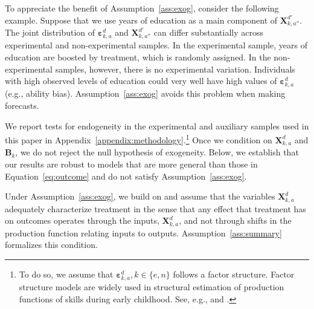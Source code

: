To appreciate the benefit of Assumption~\ref{ass:exog}, consider the following example. Suppose that we use years of education as a main component of $\bm{X}_{k,{a''}}^{d'}$. The joint distribution of $\bm{\varepsilon}_{k,a}^d$ and $\bm{X}_{k,{a''}}^{d'}$ can differ substantially across experimental and non-experimental samples. In the experimental sample, years of education are boosted by treatment, which is randomly assigned. In the non-experimental samples, however, there is no experimental variation. Individuals with high observed levels of education could very well have high values of  $\bm{\varepsilon}_{k,a}^d$ (e.g., ability bias). Assumption~\ref{ass:exog} avoids this problem when making forecasts.

We report tests for endogeneity in the experimental and auxiliary samples used in this paper in Appendix~\ref{appendix:methodology}.\footnote{To do so, we assume that $\bm{\varepsilon}_{k,a}^d, k \in \{e,n\}$ follows a factor structure. Factor structure models are widely used in structural estimation of production functions of skills during early childhood. See, e.g., \citet{Cunha_Heckman_2008_JHR} and \citet{Cunha_Heckman_etal_2010_est_tech_cognoncog}.} Once we condition on $\bm{X}_{k,a}^d$ and $\bm{B}_{k}$, we do not reject the null hypothesis of exogeneity. Below, we establish that our results are robust to models that are more general than those in Equation~\eqref{eq:outcome} and do not satisfy Assumption~\ref{ass:exog}.

Under Assumption~\ref{ass:exog}, we build on \citet{Heckman_Pinto_etal_2013_PerryFactor} and assume that the variables $\bm{X}_{k,a}^d$ adequately characterize treatment in the sense that any effect that treatment has on outcomes operates through the inputs, $\bm{X}_{k,a}^d$, and not through shifts in the production function relating inputs to outputs. Assumption~\ref{ass:summary} formalizes this condition.

